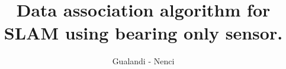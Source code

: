 \documentclass[12pt]{report}
\title{Data association algorithm for SLAM using bearing only sensor.}
\author{Gualandi - Nenci}
\begin{document}
\maketitle
\tableofcontents

\label{Introduction}


\label{Bearing}


\label{Algorithm}


\label{SideProjects}


\label{Conclusions}

\end{document}
